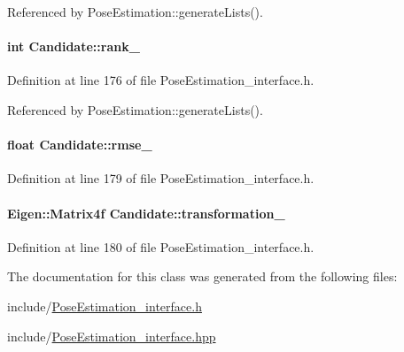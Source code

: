 Referenced by Pose\-Estimation\-::generate\-Lists().

\hypertarget{classCandidate_a671df007d258250715bfa7f80df4162c}{
\paragraph[{rank\-\_\-}]{\setlength{\rightskip}{0pt plus 5cm}int Candidate\-::rank\-\_\-\hspace{0.3cm}{\ttfamily [private]}}}\label{classCandidate_a671df007d258250715bfa7f80df4162c}


Definition at line 176 of file Pose\-Estimation\-\_\-interface.\-h.



Referenced by Pose\-Estimation\-::generate\-Lists().

\hypertarget{classCandidate_a1794f08bfc0b49287159c85034b23654}{
\paragraph[{rmse\-\_\-}]{\setlength{\rightskip}{0pt plus 5cm}float Candidate\-::rmse\-\_\-\hspace{0.3cm}{\ttfamily [private]}}}\label{classCandidate_a1794f08bfc0b49287159c85034b23654}


Definition at line 179 of file Pose\-Estimation\-\_\-interface.\-h.

\hypertarget{classCandidate_ac6dd9ee10ce1bf011b1005cfa239cc7b}{
\paragraph[{transformation\-\_\-}]{\setlength{\rightskip}{0pt plus 5cm}Eigen\-::\-Matrix4f Candidate\-::transformation\-\_\-\hspace{0.3cm}{\ttfamily [private]}}}\label{classCandidate_ac6dd9ee10ce1bf011b1005cfa239cc7b}


Definition at line 180 of file Pose\-Estimation\-\_\-interface.\-h.



The documentation for this class was generated from the following files\-:\begin{DoxyCompactItemize}
\item 
include/\hyperlink{PoseEstimation__interface_8h}{Pose\-Estimation\-\_\-interface.\-h}\item 
include/\hyperlink{PoseEstimation__interface_8hpp}{Pose\-Estimation\-\_\-interface.\-hpp}\end{DoxyCompactItemize}
